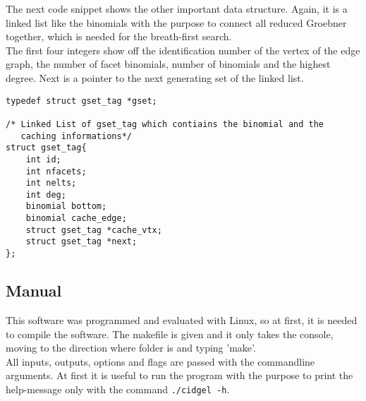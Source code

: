 The next code snippet shows the other important data structure. Again, it is a linked list like the binomials with the purpose to connect all reduced Groebner together, which is needed for the breath-first search.\\

The first four integers show off the identification number of the vertex of the edge graph, the number of facet binomials, number of binomials and the highest degree. Next is a pointer to the next generating set of the linked list.
 

\begin{lstlisting} 
typedef struct gset_tag *gset;

/* Linked List of gset_tag which contiains the binomial and the
   caching informations*/
struct gset_tag{
    int id;
    int nfacets;
    int nelts;
    int deg;
    binomial bottom;
    binomial cache_edge;
    struct gset_tag *cache_vtx;
    struct gset_tag *next;
};

\end{lstlisting}

 


 


\subsection{Manual}
\label{subsec:manual}
This software was programmed and evaluated with Linux, so at first, it is needed to compile the software. The makefile is given and it only takes the console, moving to the direction where folder is and typing 'make'. \\
All inputs, outputs, options and flags are passed with the commandline arguments. At first it is useful to run the program with the purpose to print the help-message only with the command
\texttt{./cidgel -h}.

